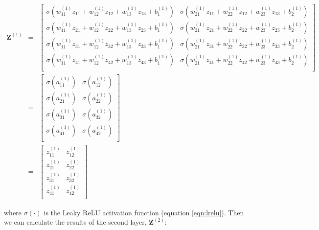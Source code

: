 \begin{eqnarray}
\mathbf{Z}^{(1)} 
& = & \left[\begin{array}{ccc}
	\sigma(w^{(1)}_{11}z_{11} + w^{(1)}_{12}z_{12} + w^{(1)}_{13}z_{13} + b^{(1)}_1) &
	\sigma(w^{(1)}_{21}z_{11} + w^{(1)}_{22}z_{12} + w^{(1)}_{23}z_{13} + b^{(1)}_2) \\
	\sigma(w^{(1)}_{11}z_{21} + w^{(1)}_{12}z_{22} + w^{(1)}_{13}z_{23} + b^{(1)}_1) &
	\sigma(w^{(1)}_{21}z_{21} + w^{(1)}_{22}z_{22} + w^{(1)}_{23}z_{23} + b^{(1)}_2) \\
	\sigma(w^{(1)}_{11}z_{31} + w^{(1)}_{12}z_{32} + w^{(1)}_{13}z_{33} + b^{(1)}_1) &
	\sigma(w^{(1)}_{21}z_{31} + w^{(1)}_{22}z_{32} + w^{(1)}_{23}z_{33} + b^{(1)}_2) \\
	\sigma(w^{(1)}_{11}z_{41} + w^{(1)}_{12}z_{42} + w^{(1)}_{13}z_{43} + b^{(1)}_1) &
	\sigma(w^{(1)}_{21}z_{41} + w^{(1)}_{22}z_{42} + w^{(1)}_{23}z_{43} + b^{(1)}_2) \\
\end{array}
\right] \nonumber \\
& = & \left[\begin{array}{ccc}	
	\sigma(a^{(1)}_{11}) & \sigma(a^{(1)}_{12}) \\
	\sigma(a^{(1)}_{21}) & \sigma(a^{(1)}_{22}) \\
	\sigma(a^{(1)}_{31}) & \sigma(a^{(1)}_{32}) \\
	\sigma(a^{(1)}_{41}) & \sigma(a^{(1)}_{42}) \\
\end{array}
\right] \nonumber \\
& = & \left[\begin{array}{ccc}	
	z^{(1)}_{11} & z^{(1)}_{12} \\
	z^{(1)}_{21} & z^{(1)}_{22} \\
	z^{(1)}_{31} & z^{(1)}_{32} \\
	z^{(1)}_{41} & z^{(1)}_{42} \\
\end{array}
\right]
\end{eqnarray}

\noindent where $\sigma(\cdot)$ is the Leaky ReLU activation function (equation \ref{eqn:lrelu}).
Then we can calculate the results of the second layer, $\mathbf{Z}^{(2)}$:

